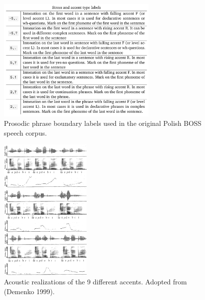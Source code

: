 \documentclass[a4paper,9pt]{beamer}
\theoremstyle{mytheoremstyle}
\begin{document}
\begin{frame}
\begin{figure}
\begin{center}
  \includegraphics[width=0.7\textwidth]{res/boundary_tones}
\end{center}
	\caption{Prosodic phrase boundary labels used in the original Polish BOSS speech corpus.}
\end{figure}
\end{frame}

\begin{frame}
\begin{figure}
\begin{center}
  \includegraphics[width=0.4\textwidth]{res/tonal_accents}
\end{center}
	\caption{Acoustic realizations of the 9 different accents. Adopted from (Demenko 1999).}
\end{figure}
\end{frame}
\end{document}
